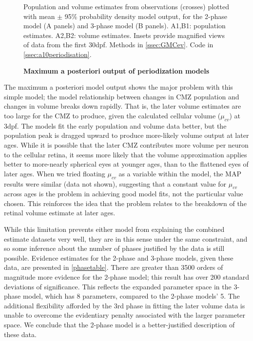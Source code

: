 \begin{figure}[!h]
    \caption{{\bf Maximum a posteriori output of periodization models}}
    \label{phaseMAPout}
    Population and volume estimates from observations (crosses) plotted with mean $\pm$ 95\% probability density model output, for the 2-phase model (A panels) and 3-phase model (B panels). A1,B1: population estimates. A2,B2: volume estimates. Insets provide magnified views of data from the first 30dpf.
    Methods in \autoref{ssec:GMCev}.
    Code in \autoref{ssec:a10periodisation}.
\end{figure}

The maximum a posteriori model output shows the major problem with this simple model; the model relationship between changes in CMZ population and changes in volume breaks down rapidly. That is, the later volume estimates are too large for the CMZ to produce, given the calculated cellular volume ($\mu_{cv}$) at 3dpf. The models fit the early population and volume data better, but the population peak is dragged upward to produce more-likely volume output at later ages. While it is possible that the later CMZ contributes more volume per neuron to the cellular retina, it seems more likely that the volume approximation applies better to more-nearly spherical eyes at younger ages, than to the flattened eyes of later ages. When we tried floating $\mu_{cv}$ as a variable within the model, the MAP results were similar (data not shown), suggesting that a constant value for $\mu_{cv}$ across ages is the problem in achieving good model fits, not the particular value chosen. This reinforces the idea that the problem relates to the breakdown of the retinal volume estimate at later ages.

While this limitation prevents either model from explaining the combined estimate datasets very well, they are in this sense under the same constraint, and so some inference about the number of phases justified by the data is still possible. Evidence estimates for the 2-phase and 3-phase models, given these data, are presented in \autoref{phasetable}. There are greater than 3500 orders of magnitude more evidence for the 2-phase model; this result has over 200 standard deviations of significance. This reflects the expanded parameter space in the 3-phase model, which has 8 parameters, compared to the 2-phase models' 5. The additional flexibility afforded by the 3rd phase in fitting the later volume data is unable to overcome the evidentiary penalty associated with the larger parameter space. We conclude that the 2-phase model is a better-justified description of these data.

